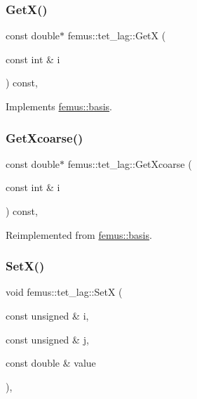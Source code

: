 \subsubsection{\texorpdfstring{Get\+X()}{GetX()}}
{\footnotesize\ttfamily const double$\ast$ femus\+::tet\+\_\+lag\+::\+GetX (\begin{DoxyParamCaption}\item[{const int \&}]{i }\end{DoxyParamCaption}) const\hspace{0.3cm}{\ttfamily [inline]}, {\ttfamily [virtual]}}



Implements \mbox{\hyperlink{classfemus_1_1basis_a00597122bbc75877f1c184f8fce4986c}{femus\+::basis}}.

\mbox{\label{classfemus_1_1tet__lag_a7abd03724f2fbcd92829a2c56fb1c49d}} 
\subsubsection{\texorpdfstring{Get\+Xcoarse()}{GetXcoarse()}}
{\footnotesize\ttfamily const double$\ast$ femus\+::tet\+\_\+lag\+::\+Get\+Xcoarse (\begin{DoxyParamCaption}\item[{const int \&}]{i }\end{DoxyParamCaption}) const\hspace{0.3cm}{\ttfamily [inline]}, {\ttfamily [virtual]}}



Reimplemented from \mbox{\hyperlink{classfemus_1_1basis_afcabbbda61ede8f30158fe08ee0a5258}{femus\+::basis}}.

\mbox{\label{classfemus_1_1tet__lag_a776f9fdab9de50b036cc3f30abe85d35}} 
\subsubsection{\texorpdfstring{Set\+X()}{SetX()}}
{\footnotesize\ttfamily void femus\+::tet\+\_\+lag\+::\+SetX (\begin{DoxyParamCaption}\item[{const unsigned \&}]{i,  }\item[{const unsigned \&}]{j,  }\item[{const double \&}]{value }\end{DoxyParamCaption})\hspace{0.3cm}{\ttfamily [inline]}, {\ttfamily [virtual]}}



